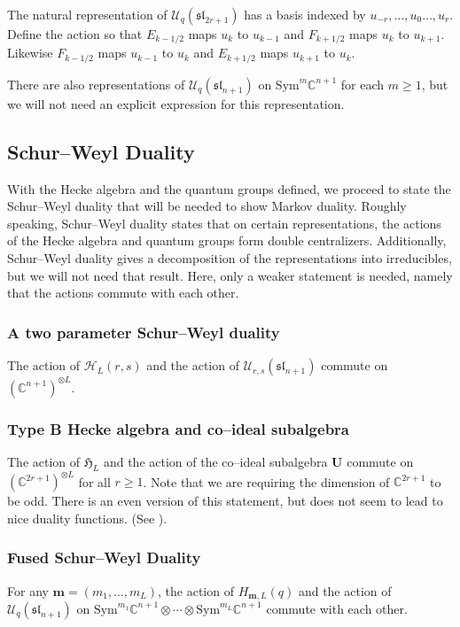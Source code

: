\documentclass[12pt]{ximera}
\begin{document}
The natural representation of $\mathcal{U}_q(\mathfrak{sl}_{2r+1})$ has a basis indexed by $u_{-r},\ldots,u_0\ldots,u_r$. Define the action so that $E_{k-1/2}$ maps $u_k$ to $u_{k-1}$ and $F_{k+1/2}$ maps $u_k$ to $u_{k+1}$. Likewise $F_{k-1/2}$ maps $u_{k-1}$ to $u_k$ and $E_{k+1/2}$ maps $u_{k+1}$ to $u_k$. 


There are also representations of $\mathcal{U}_q(\mathfrak{sl}_{n+1})$ on $\mathrm{Sym}^m \mathbb{C}^{n+1}$ for each $m\geq 1$, but we will not need an explicit expression for this representation.

\subsection{Schur--Weyl Duality}
With the Hecke algebra and the quantum groups defined, we proceed to state the Schur--Weyl duality that will be needed to show Markov duality. Roughly speaking, Schur--Weyl duality states that on certain representations, the actions of the Hecke algebra and quantum groups form double centralizers. Additionally, Schur--Weyl duality gives a decomposition of the representations into irreducibles, but we will not need that result. Here, only a weaker statement is needed, namely that the actions commute with each other. 

\subsubsection{A two parameter Schur--Weyl duality}
The action of $\mathcal{H}_L(r,s)$ and the action of $\mathcal{U}_{r,s}(\mathfrak{sl}_{n+1})$ commute on $(\mathbb{C}^{n+1} )^{\otimes L}$.

\subsubsection{Type B Hecke algebra and co--ideal subalgebra}
The action of $\mathfrak{H}_L$ and the action of the co--ideal subalgebra $\mathbf{U}$ commute on $(\mathbb{C}^{2r+1} )^{\otimes L}$ for all $r \geq 1$. Note that we are requiring the dimension of $\mathbb{C}^{2r+1}$ to be odd. There is an even version of this statement, but does not seem to lead to nice duality functions. (See \cite{KOpen}).

\subsubsection{Fused Schur--Weyl Duality}
For any $\mathbf{m}=(m_1,\ldots,m_L)$, the action of $H_{\mathbf{m},L}(q)$ and the action of $\mathcal{U}_q(\mathfrak{sl}_{n+1})$ on $\mathrm{Sym}^{m_1} \mathbb{C}^{n+1} \otimes \cdots \otimes \mathrm{Sym}^{m_L} \mathbb{C}^{n+1} $ commute with each other.
\end{document}
